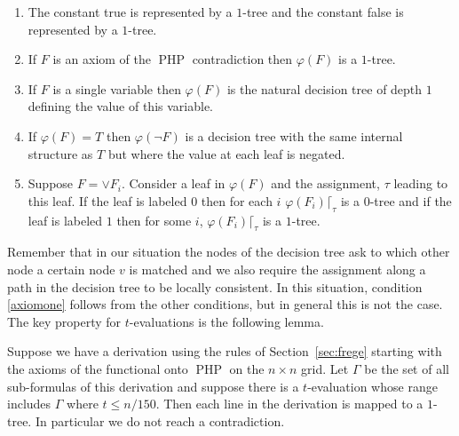 \documentclass{article}\usepackage[a4paper,margin=20mm]{geometry}
\DeclareMathOperator{\PHP}{PHP}
\begin{document}
\begin{enumerate}

\item The constant true is represented by a $1$-tree and the
constant false is represented by a $1$-tree.

\item If $F$ is an axiom of the $\PHP$ \label{axiomone}
contradiction then $\varphi(F)$ is a $1$-tree.

\item If $F$ is a single variable then
$\varphi(F)$ is the natural decision tree of depth $1$ defining
the value of this variable.

\item If $\varphi(F)=T$ then $\varphi(\neg F)$
is a decision tree with the same internal structure as $T$
but where the value at each leaf is negated.

\item Suppose $F= \lor F_i$. \label{rule:or}
Consider a leaf in $\varphi (F)$ and the assignment, $\tau$ leading to this
leaf.  If the leaf is labeled $0$ then for each $i$ 
$\varphi(F_i) \lceil_\tau$ is a $0$-tree and if the leaf is
labeled $1$ then for some $i$, $\varphi(F_i) \lceil_\tau$ is a $1$-tree.

\end{enumerate}

Remember that in our situation the nodes of the decision tree 
ask to which other node a certain node $v$ is matched and we
also require the assignment along a path in the decision tree
to be locally consistent. In this situation,  
condition \ref{axiomone} follows from
the other conditions, but in general this is not the case.
The key property for $t$-evaluations is the following
lemma.

\begin{lemma}\label{lemma:noproof}
Suppose we have a derivation using the rules
of Section~\ref{sec:frege} starting with the
axioms of the functional onto $\PHP$ on the $n \times n$ grid.
Let $\Gamma$ be the set of all sub-formulas of this derivation
and suppose  there is a $t$-evaluation whose range includes $\Gamma$ where
$ t \leq n/150$. 
Then each line in the derivation is mapped to a $1$-tree.
In particular we do not reach a contradiction.
\end{lemma}
\end{document}
